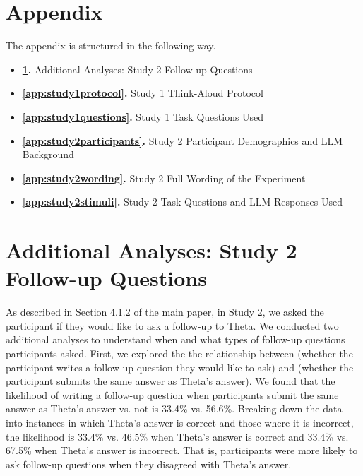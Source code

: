 
\section*{Appendix}

\renewcommand{\thesection}{\Alph{section}}

\renewcommand\thefigure{\thesection\arabic{figure}}
\renewcommand\thetable{\thesection\arabic{table}}



The appendix is structured in the following way.
\begin{itemize}%
    \item \textbf{\cref{app:study2followup}.} Additional Analyses: Study 2 Follow-up Questions
    \item \textbf{\cref{app:study1protocol}.} Study 1 Think-Aloud Protocol
    \item \textbf{\cref{app:study1questions}.} Study 1 Task Questions Used
    \item \textbf{\cref{app:study2participants}.} Study 2 Participant Demographics and LLM Background
    \item \textbf{\cref{app:study2wording}.} Study 2 Full Wording of the Experiment
    \item \textbf{\cref{app:study2stimuli}.} Study 2 Task Questions and LLM Responses Used
\end{itemize}



\section{Additional Analyses: Study 2 Follow-up Questions}
\label{app:study2followup}


As described in Section 4.1.2 of the main paper, in Study 2, we asked the participant if they would like to ask a follow-up to Theta.
We conducted two additional analyses to understand when and what types of follow-up questions participants asked.
First, we explored the the relationship between  (whether the participant writes a follow-up question they would like to ask) and  (whether the participant submits the same answer as Theta's answer).
We found that the likelihood of writing a follow-up question when participants submit the same answer as Theta's answer vs. not is 33.4\% vs. 56.6\%. Breaking down the data into instances in which Theta's answer is correct and those where it is incorrect, the likelihood is 33.4\% vs. 46.5\% when Theta's answer is correct and 33.4\% vs. 67.5\% when Theta's answer is incorrect. That is, participants were more likely to ask follow-up questions when they disagreed with Theta's answer. 


